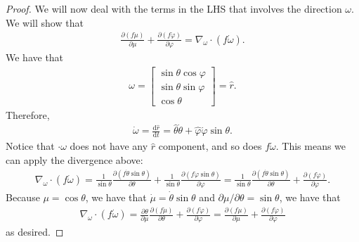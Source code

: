 \documentclass[10pt]{article}
\newcommand{\dee}{\mathrm{d}}
\begin{document}
\begin{itemize}
\begin{proof}
      We will now deal with the terms in the LHS that involves the direction $\omega$. We will show that
      \begin{align*}
        \frac{\partial (f \dot\mu)}{\partial \mu} + \frac{\partial (f \dot\varphi)}{\partial \varphi}
        = \nabla_\omega \cdot (f \dot \omega).
      \end{align*}
      We have that
      \begin{align*}
        \omega = \begin{bmatrix}
          \sin\theta \cos\varphi \\
          \sin\theta \sin\varphi \\
          \cos\theta
        \end{bmatrix}
        = \hat{r}.
      \end{align*}
      Therefore,
      \begin{align*}
        \dot \omega 
        = \frac{\dee \hat{r}}{\dee t} = \hat \theta \dot\theta + \hat \varphi \dot \varphi \sin\theta.      
      \end{align*}
      Notice that $\cdot\omega$ does not have any $\hat r$ component, and so does $f\dot\omega$. This means we can apply the divergence above:    
      \begin{align*}
        \nabla_\omega \cdot (f\dot\omega) 
        = \frac{1}{\sin \theta} \frac{\partial (f \dot \theta \sin \theta)}{\partial \theta} + \frac{1}{\sin\theta} \frac{\partial (f \dot\varphi \sin\theta)}{\partial \varphi}
        = \frac{1}{\sin \theta} \frac{\partial (f \dot \theta \sin \theta)}{\partial \theta} + \frac{\partial (f \dot\varphi)}{\partial \varphi}.
      \end{align*}
      Because $\mu = \cos\theta$, we have that $\dot \mu = \dot\theta \sin\theta$ and $\partial \mu / \partial \theta = \sin\theta$, we have that
      \begin{align*}
        \nabla_\omega \cdot (f\dot\omega) 
        = \frac{\partial \theta}{\partial \mu} \frac{\partial (f \dot\mu)}{\partial \theta} + \frac{\partial (f \dot\varphi)}{\partial \varphi}
        = \frac{\partial (f \dot\mu)}{\partial \mu} + \frac{\partial (f \dot\varphi)}{\partial \varphi}
      \end{align*}
      as desired. 


\end{proof}
\end{itemize}
\end{document}
